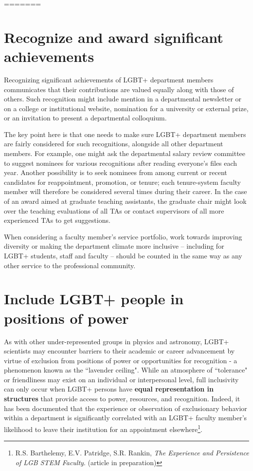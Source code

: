 =======
\section {Recognize and award significant achievements}
\label{recognize-achievements}
Recognizing significant achievements of LGBT+ department members communicates that their contributions are valued equally along with those of others. Such recognition might include mention in a departmental newsletter or on a college or institutional website, nomination for a university or external prize, or an invitation to present a departmental colloquium.

The key point here is that one needs to make sure LGBT+ department members are fairly considered for such recognitions, alongside all other department members. For example, one might ask the departmental salary review committee to suggest nominees for various recognitions after reading everyone's files each year. Another possibility is to seek nominees from among current or recent candidates for reappointment, promotion, or tenure; each tenure-system faculty member will therefore be considered several times during their career. In the case of an award aimed at graduate teaching assistants, the graduate chair might look over the teaching evaluations of all TAs or contact supervisors of all more experienced TAs to get suggestions.

When considering a faculty member's service portfolio, work towards improving diversity or making the department climate more inclusive -- including for LGBT+ students, staff and faculty -- should be counted in the same way as any other service to the professional community.


\section {Include LGBT+ people in positions of power}
\label{positions-of-power}
As with other under-represented groups in physics and astronomy, LGBT+ scientists may encounter barriers to their academic or career advancement by virtue of exclusion from positions of power or opportunities for recognition - a phenomenon known as the ``lavender ceiling". While an atmosphere of ``tolerance" or friendliness may exist on an individual or interpersonal level, full inclusivity can only occur when LGBT+ persons have \textbf{equal representation in structures} that provide access to power, resources, and recognition. Indeed, it has been documented that the experience or observation of exclusionary behavior within a department is significantly correlated with an LGBT+ faculty member's likelihood to leave their institution for an appointment elsewhere\footnote{R.S. Barthelemy, E.V. Patridge, S.R. Rankin, \emph{The Experience and Persistence of LGB STEM Faculty}. (article in preparation)}.

